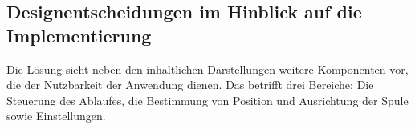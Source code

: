 \subsection{Designentscheidungen im Hinblick auf die Implementierung}
\label{sec-4-3}
Die Lösung sieht neben den inhaltlichen Darstellungen weitere Komponenten vor, die der Nutzbarkeit der Anwendung dienen. Das betrifft drei Bereiche: Die Steuerung des Ablaufes, die Bestimmung von Position und Ausrichtung der Spule sowie Einstellungen.\\

